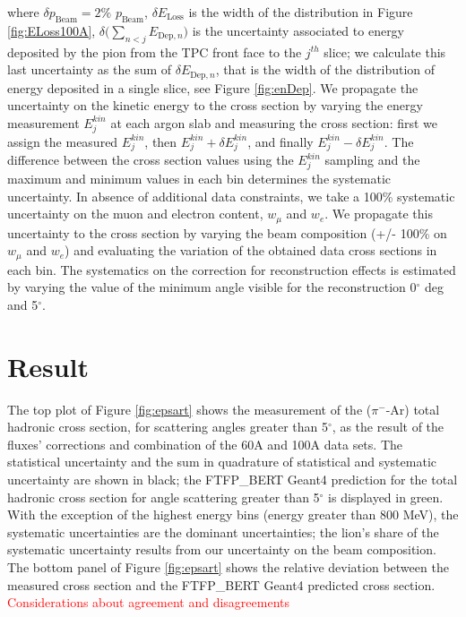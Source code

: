 \documentclass[aps,prl,twocolumn,showpacs,superscriptaddress,groupedaddress]{revtex4}  %
\begin{document}
where $\delta p_{\text{Beam}} = 2\%$ $p_{\text{Beam}}$, $\delta E_{\text{Loss}}$ is the width of the distribution in Figure \ref{fig:ELoss100A}, $\delta \Big(\sum_{n < j} E_{\text{Dep},n}\Big)$  is the uncertainty associated to energy deposited by the pion from the TPC front face to the $j^{th}$ slice; we calculate this last uncertainty as  the sum of $\delta E_{\text{Dep},n}$, that is the width  of the  distribution of energy deposited in a single slice, see Figure \ref{fig:enDep}. We propagate the uncertainty on the kinetic energy to the cross section by varying the energy measurement $E^{kin}_{j}$ at each argon slab and measuring the cross section: first we assign the measured $E^{kin}_{j}$, then  $E^{kin}_{j} + \delta E^{kin}_{j}$, and finally  $E^{kin}_{j} - \delta E^{kin}_{j}$. The difference between the cross section values using the $E^{kin}_{j}$ sampling and the maximum and minimum values in each bin determines the systematic uncertainty.
In absence of additional data constraints,  we take a 100\% systematic uncertainty on the muon and electron content, $w_\mu$ and $w_e$.  We propagate this uncertainty  to the cross section by varying the beam composition (+/- 100\% on $w_\mu$ and $w_e$) and evaluating the variation of the obtained  data cross sections in each bin.  The systematics on the correction for reconstruction effects is estimated by varying the value of the minimum angle visible for the reconstruction 0$^\circ$ deg and 5$^\circ$. 



\section{\label{sec:Results}Result}
The top plot of Figure \ref{fig:epsart} shows the measurement of the ($\pi^-$-Ar) total hadronic cross section,  for  scattering angles greater than 5$^\circ$, as the result of the fluxes' corrections and combination of the 60A and 100A data sets. The statistical uncertainty and the sum in quadrature of statistical and systematic uncertainty are shown in black;  the FTFP\_BERT Geant4 prediction for the total hadronic cross section for angle scattering greater than 5$^\circ$ is displayed in green. 
With the exception of the highest energy bins (energy greater than 800 MeV), the systematic uncertainties are the dominant uncertainties; the lion's share of the systematic uncertainty results from our uncertainty on the beam composition. The bottom panel of Figure  \ref{fig:epsart} shows the relative deviation between the measured cross section and the FTFP\_BERT  Geant4 predicted cross section.
\textcolor{red}{Considerations about agreement and disagreements}
\end{document}
